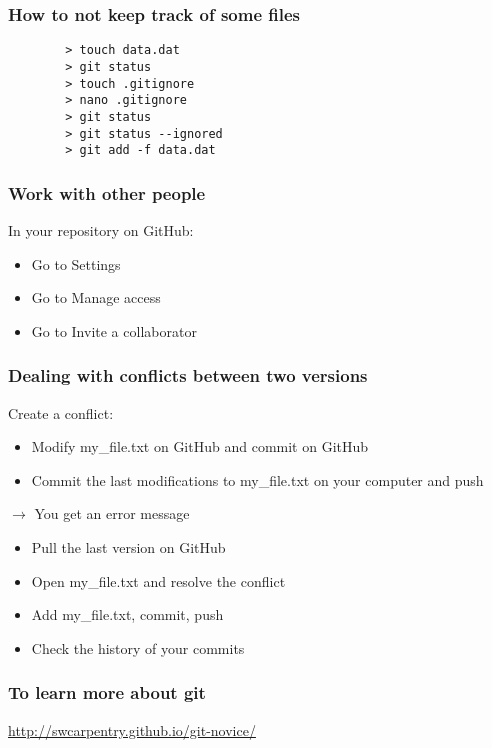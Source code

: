 \documentclass{beamer}
\begin{document}
	\begin{frame}[fragile]
	\frametitle{How to not keep track of some files}
	\begin{exampleblock}{}
		\begin{verbatim}
		> touch data.dat
		> git status
		> touch .gitignore
		> nano .gitignore
		> git status
		> git status --ignored
		> git add -f data.dat
		\end{verbatim}
	\end{exampleblock}
	\end{frame}

	\begin{frame}
	\frametitle{Work with other people}
	In your repository on GitHub:

	\vspace{0.5cm}

	\begin{itemize}
	\setlength\itemsep{1em}
		\item Go to Settings
		\item Go to Manage access
		\item Go to Invite a collaborator
	\end{itemize}
	\end{frame}

	\begin{frame}
	\frametitle{Dealing with conflicts between two versions}
	Create a conflict:
	\begin{itemize}
		\item Modify my\_file.txt on GitHub and commit on GitHub
		\item Commit the last modifications to my\_file.txt on your computer and push
	\end{itemize}
	$\rightarrow$ You get an error message
	\begin{itemize}
		\item Pull the last version on GitHub
		\item Open my\_file.txt and resolve the conflict
		\item Add my\_file.txt, commit, push
		\item Check the history of your commits
	\end{itemize}
	\end{frame}

	\begin{frame}
	\frametitle{To learn more about git}
        	\href{http://swcarpentry.github.io/git-novice/}{http://swcarpentry.github.io/git-novice/}
	\end{frame}
\end{document}
